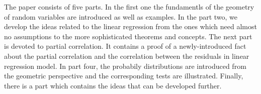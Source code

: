 \begin{fullwidth}
The paper consists of five parts. In the first one the fundamentls of the geometry
of random variables are introduced as well as examples.
In the part two, we develop the ideas related to the linear regression
from the ones which need almost no assumptions to the more sophisticated theorems
and concepts.
The next part is devoted to partial correlation. It contains a proof of
a newly-introduced fact about the partial correlation and the correlation
between the residuals in linear regression model.
In part four, the probabily distributions are introduced from the geometric perspective
and the corresponding tests are illustrated.
Finally, there is a part which contains the ideas that can be developed further.

\end{fullwidth}
